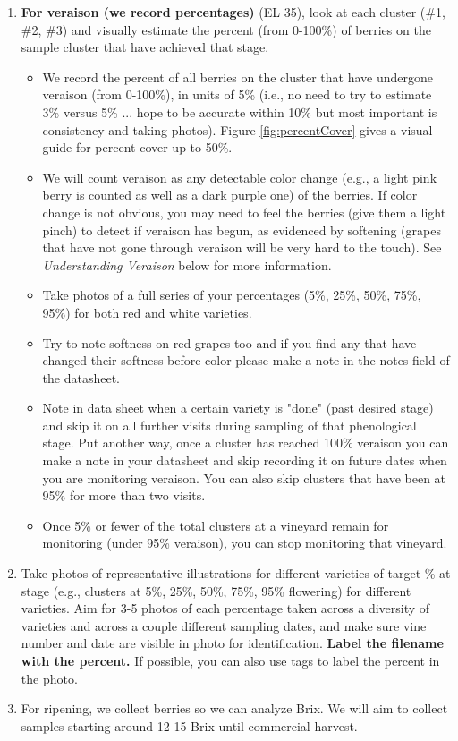\documentclass[11pt,letter]{article}
\newenvironment{smitemize}{
\begin{itemize}
  \setlength{\itemsep}{0pt}
  \setlength{\parskip}{0.8pt}
  \setlength{\parsep}{0pt}}
{\end{itemize}
}
\begin{document}
\begin{enumerate}
\item {\bf For veraison (we record percentages)} (EL 35), look at each cluster (\#1, \#2, \#3) and visually estimate the percent (from 0-100\%) of berries on the sample cluster that have achieved that stage. 
	\begin{smitemize}
       \item We record the percent of all berries on the cluster that have undergone veraison (from 0-100\%), in units of 5\% (i.e., no need to try to estimate 3\% versus 5\% ... hope to be accurate within 10\% but most important is consistency and taking photos).  Figure \ref{fig:percentCover} gives a visual guide for percent cover up to 50\%.
	\item We will count veraison as any detectable color change (e.g., a light pink berry is counted as well as a dark purple one) of the berries. If color change is not obvious, you may need to feel the berries (give them a light pinch) to detect if veraison has begun, as evidenced by softening (grapes that have not gone through veraison will be very hard to the touch). See \textit{Understanding Veraison} below for more information.
	\item Take photos of a full series of your percentages (5\%, 25\%, 50\%, 75\%, 95\%) for both red and white varieties. 
	\item Try to note softness on red grapes too and if you find any that have changed their softness before color please make a note in the notes field of the datasheet.
	\item Note in data sheet when a certain variety is "done" (past desired stage) and skip it on all further visits during sampling of that phenological stage. Put another way, once a cluster has reached 100\% veraison you can make a note in your datasheet and skip recording it on future dates when you are monitoring veraison. You can also skip clusters that have been at 95\% for more than two visits.
	\item Once 5\% or fewer of the total clusters at a vineyard remain for monitoring (under 95\% veraison), you can stop monitoring that vineyard.
	\end{smitemize}
\item Take photos of representative illustrations for different varieties of target \% at stage (e.g., clusters at 5\%, 25\%, 50\%, 75\%, 95\% flowering) for different varieties. Aim for 3-5 photos of each percentage taken across a diversity of varieties and across a couple different sampling dates, and make sure vine number and date are visible in photo for identification. {\bf Label the filename with the percent.} If possible, you can also use tags to label the percent in the photo. 
\item For ripening, we collect berries so we can analyze Brix. We will aim to collect samples starting around 12-15 Brix until commercial harvest. \\
	

\end{enumerate}
\end{document}
